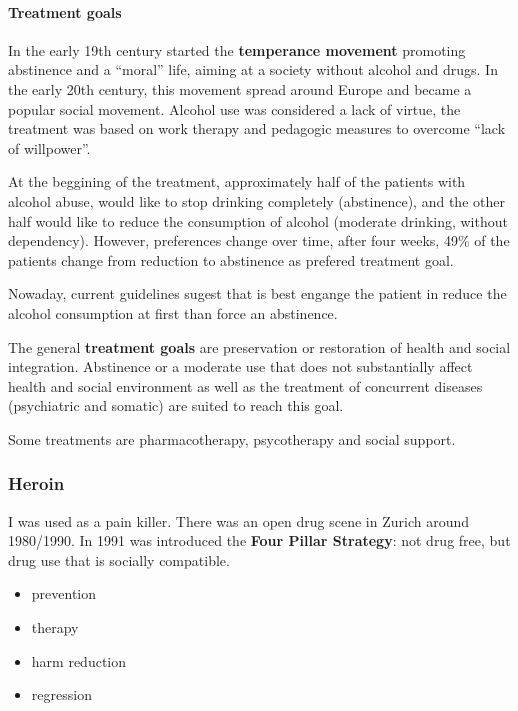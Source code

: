 \documentclass[12pt,article,oneside,a4paper]{memoir}
\begin{document}
\paragraph{Treatment goals} 
In the early 19th century started the \textbf{temperance movement} promoting
abstinence and a ``moral'' life, aiming at a society without alcohol and drugs.
In the early 20th century, this movement spread around Europe and became a
popular social movement. Alcohol use was considered a lack of virtue, the
treatment was based on work therapy and pedagogic measures to overcome ``lack
of willpower''.

At the beggining of the treatment, approximately half of the patients with
alcohol abuse, would like to stop drinking completely (abstinence), and the
other half would like to reduce the consumption of alcohol (moderate drinking,
without dependency). However, preferences change over time, after four weeks,
49\% of the patients change from reduction to abstinence as prefered treatment
goal.

Nowaday, current guidelines sugest that is best engange the patient in reduce
the alcohol consumption at first than force an abstinence.

The general \textbf{treatment goals} are preservation or restoration of health
and social integration. Abstinence or a moderate use that does not substantially
affect health and social environment as well as the treatment of concurrent
diseases (psychiatric and somatic) are suited to reach this goal.

Some treatments are pharmacotherapy, psycotherapy and social support.

\subsubsection{Heroin}
I was used as a pain killer. There was an open drug scene in Zurich around 1980/1990.
In 1991 was introduced the \textbf{Four Pillar Strategy}: not drug free, but
drug use that is socially compatible.
\begin{itemize}
\item prevention
\item therapy
\item harm reduction
\item regression
\end{itemize}
\end{document}
